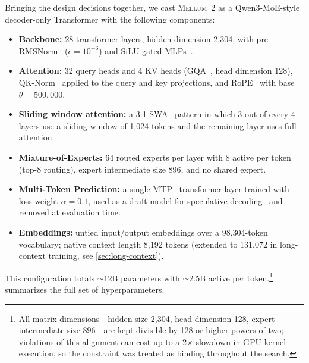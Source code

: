 \documentclass[11pt,a4paper]{article}
\newcommand{\modelname}{\textsc{Mellum~2}\xspace}
\begin{document}
Bringing the design decisions together, we cast \modelname as a Qwen3-MoE-style
decoder-only Transformer with the following components:

\enlargethispage{2\baselineskip}
\begin{itemize}[itemsep=2pt,topsep=4pt,parsep=0pt]
  \item \textbf{Backbone:} 28 transformer layers, hidden dimension 2{,}304, with
    pre-RMSNorm~\cite{zhang2019rmsnorm} ($\epsilon = 10^{-6}$) and SiLU-gated MLPs~\cite{shazeer2020glu}.
  \item \textbf{Attention:} 32 query heads and 4 KV heads (GQA~\cite{ainslie2023gqa}, head
    dimension 128), QK-Norm~\cite{henry2020qknorm} applied to the query and key projections, and RoPE~\cite{su2024roformer}
    with base $\theta = 500{,}000$.
  \item \textbf{Sliding window attention:} a 3:1 SWA~\cite{beltagy2020longformer} pattern in which 3 out of
    every 4 layers use a sliding window of 1{,}024 tokens and the remaining
    layer uses full attention.
  \item \textbf{Mixture-of-Experts:} 64 routed experts per layer with 8 active
    per token (top-8 routing), expert intermediate size 896, and no shared
    expert.
  \item \textbf{Multi-Token Prediction:} a single MTP~\cite{gloeckle2024mtp} transformer layer trained
    with loss weight $\alpha = 0.1$, used as a draft model for speculative
    decoding~\cite{leviathan2023speculative} and removed at evaluation time.
  \item \textbf{Embeddings:} untied input/output embeddings over a 98{,}304-token
    vocabulary; native context length 8{,}192 tokens (extended to 131{,}072 in
    long-context training, see \cref{sec:long-context}).
\end{itemize}

This configuration totals ${\sim}$12B parameters with ${\sim}$2.5B active per
token.\footnote{All matrix dimensions---hidden size 2{,}304, head dimension 128,
expert intermediate size 896---are kept divisible by 128 or higher powers of
two; violations of this alignment can cost up to a 2$\times$ slowdown in GPU
kernel execution, so the constraint was treated as binding throughout the
search.}
 summarizes the full set of hyperparameters.
\end{document}
